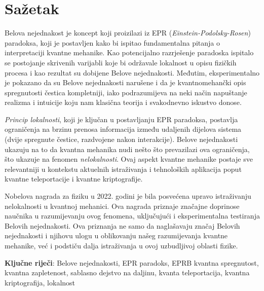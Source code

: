 \chapter*{Sažetak}
\sloppy

Belova nejednakost je koncept koji proizilazi iz EPR ({\it{Einstein-Podolsky-Rosen}}) paradoksa, koji je postavljen kako bi ispitao fundamentalna pitanja o interpretaciji kvantne mehanike.
Kao potencijalno razrješenje paradoska ispitalo se postojanje skrivenih varijabli koje bi održavale lokalnost u opisu fizičkih procesa i kao rezultat su dobijene Belove nejednakosti.
Međutim, eksperimentalno je pokazano da su Belove nejednakosti narušene i da je kvantnomehančki opis spregnutosti čestica kompletniji, iako podrazumijeva na neki način napuštanje realizma i intuicije koju
nam klasična teorija i svakodnevno iskustvo donose.

{\it{Princip lokalnosti}}, koji je ključan u postavljanju EPR paradoksa,
postavlja ograničenja na brzinu prenosa informacija između udaljenih dijelova sistema (dvije spregnute čestice, razdvojene nakon interakcije). Belove nejednakosti ukazuju na to da kvantna mehanika nudi nešto što prevazilazi ova ograničenja, što ukazuje na fenomen {\it{nelokalnosti}}. Ovaj aspekt kvantne mehanike postaje sve relevantniji u kontekstu aktuelnih istraživanja i tehnoloških aplikacija poput kvantne teleportacije i kvantne kriptografije.

Nobelova nagrada za fiziku u 2022. godini je bila posvećena upravo istraživanju nelokalnosti u kvantnoj mehanici. Ova nagrada priznaje značajne doprinose naučnika u razumijevanju ovog fenomena, uključujući i eksperimentalna testiranja Belovih nejednakosti. Ova priznanja ne samo da naglašavaju značaj Belovih nejednakosti i njihovu ulogu u oblikovanju našeg razumijevanja kvantne mehanike, već i podstiču dalja istraživanja u ovoj uzbudljivoj oblasti fizike.

{\textbf{Ključne riječi}}: Belove nejednakosti, EPR paradoks, EPRB kvantna spregnutost, kvantna zapletenost, sablasno dejstvo na daljinu, kvanta teleportacija, kvantna kriptografija, lokalnost